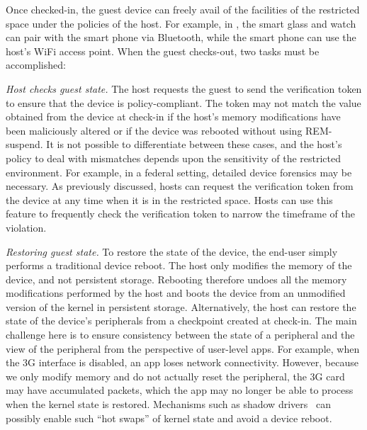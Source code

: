  Once checked-in, the guest device can freely avail of
the facilities of the restricted space under the policies of the host. For
example, in , the smart glass and watch can
pair with the smart phone via Bluetooth, while the smart phone can use the
host's WiFi access point. When the guest checks-out, two tasks must be
accomplished:
%
\begin{mylist}
%
\item \textit{Host checks guest state.} The host requests the guest to send the
verification token to ensure that the device is policy-compliant. The token may
not match the value obtained from the device at check-in if the host's memory
modifications have been maliciously altered or if the device was rebooted
without using REM-suspend. It is not possible to differentiate between these
cases, and the host's policy to deal with mismatches depends upon the
sensitivity of the restricted environment. For example, in a federal setting,
detailed device forensics may be necessary. As previously discussed, hosts can
request the verification token from the device at any time when it is in the
restricted space. Hosts can use this feature to frequently check the
verification token to narrow the timeframe of the violation.

\item \textit{Restoring guest state.} To restore the state of the device, the
end-user simply performs a traditional device reboot. The host only modifies
the memory of the device, and not persistent storage. Rebooting therefore
undoes all the memory modifications performed by the host and boots the device
from an unmodified version of the kernel in persistent storage. Alternatively,
the host can restore the state of the device's peripherals from a checkpoint
created at check-in. The main challenge here is to ensure consistency between
the state of a peripheral and the view of the peripheral from the perspective
of user-level apps. For example, when the 3G interface is disabled, an app
loses network connectivity. However, because we only modify memory and do not
actually reset the peripheral, the 3G card may have accumulated packets, which
the app may no longer be able to process when the kernel state is restored.
Mechanisms such as shadow drivers~\cite{shadow:tocs06} can possibly enable 
such ``hot swaps'' of kernel state and avoid a device reboot.
%
\end{mylist}

